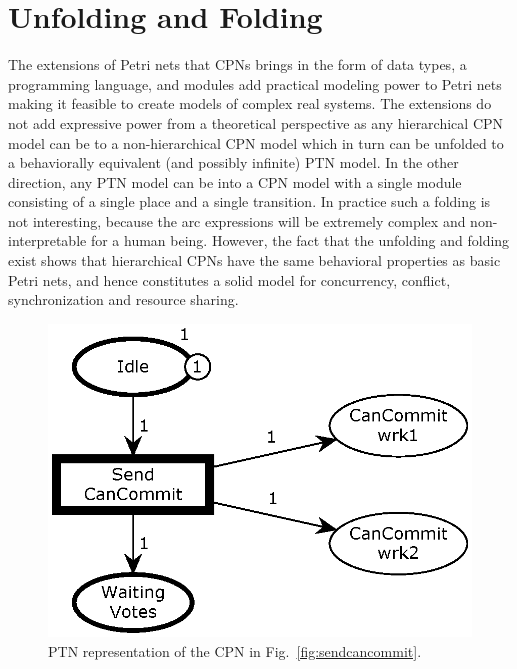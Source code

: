 \section{Unfolding and Folding}

The extensions of Petri nets that CPNs brings in the form of data
types, a programming language, and modules add practical modeling
power to Petri nets making it feasible to create models of complex
real systems. The extensions do not add expressive power from a
theoretical perspective as any hierarchical CPN model can be
 to a non-hierarchical CPN model which in turn can
be unfolded to a behaviorally equivalent (and possibly infinite) PTN
model. In the other direction, any PTN model can be 
into a CPN model with a single module consisting of a single place and
a single transition. In practice such a folding is not interesting,
because the arc expressions will be extremely complex and
non-interpretable for a human being. However, the fact that the
unfolding and folding exist shows that hierarchical CPNs have the same
behavioral properties as basic Petri nets, and hence constitutes a
solid model for concurrency, conflict, synchronization and resource
sharing.




\begin{figure}[b]
\centering
\includegraphics[scale=.45]{figures/PTSendCanCommit.eps}
\caption{PTN representation of the CPN in Fig.~\ref{fig:sendcancommit}.}
\label{fig:sendcancommitunfold}
\end{figure}

